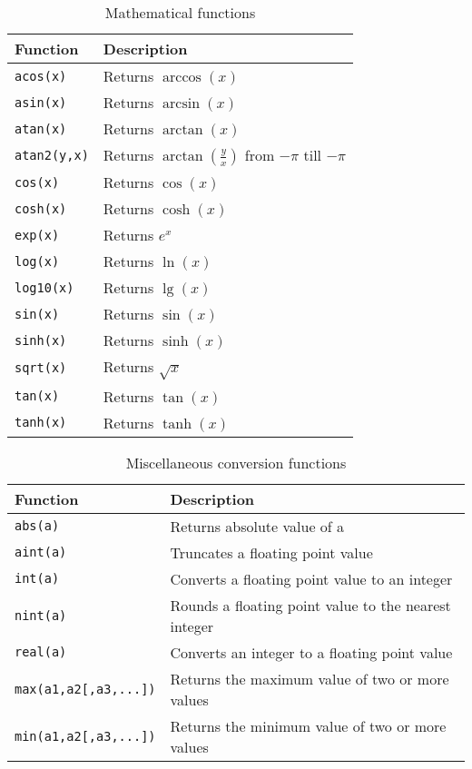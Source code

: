 \begin{table}[!hb]
\begin{center}
\begin{tabular}{|l|l|}
\hline Function & Description \\ \hline
\lstinline!acos(x)! & Returns $\arccos(x)$ \\
\lstinline!asin(x)! & Returns $\arcsin(x)$ \\
\lstinline!atan(x)! & Returns $\arctan(x)$ \\
\lstinline!atan2(y,x)! & Returns $\arctan(\frac{y}{x})$ from $-\pi$ till $-\pi$ \\
\lstinline!cos(x)!  & Returns $\cos(x)$ \\
\lstinline!cosh(x)! & Returns $\cosh(x)$ \\
\lstinline!exp(x)!  & Returns $e^{x}$ \\
\lstinline!log(x)!  & Returns $\ln(x)$ \\
\lstinline!log10(x)! & Returns $\lg(x)$ \\
\lstinline!sin(x)! & Returns $\sin(x)$ \\
\lstinline!sinh(x)! & Returns $\sinh(x)$ \\
\lstinline!sqrt(x)! & Returns $\sqrt{x}$\\
\lstinline!tan(x)! & Returns $\tan(x)$ \\
\lstinline!tanh(x)! & Returns $\tanh(x)$ \\ \hline
\end{tabular}
\end{center}
\caption{Mathematical functions}
\end{table}

\begin{table}[!hb]
\begin{center}
\begin{tabular}{|l|l|}
\hline Function & Description \\ \hline
\lstinline!abs(a)!  & Returns absolute value of a \\
\lstinline!aint(a)! & Truncates a floating point value \\
\lstinline!int(a)!  & Converts a floating point value to an integer \\
\lstinline!nint(a)! & Rounds a floating point value to the nearest integer \\
\lstinline!real(a)! & Converts an integer to a floating point value \\
\lstinline!max(a1,a2[,a3,...])! & Returns the maximum value of two or more values \\
\lstinline!min(a1,a2[,a3,...])! & Returns the minimum value of two or more values \\
\hline
\end{tabular}
\end{center}
\caption{Miscellaneous conversion functions}
\end{table}

